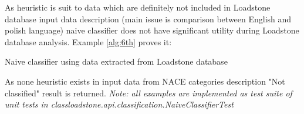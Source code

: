 As heuristic is suit to data which are definitely not included in Loadstone database input data description (main issue is comparison between English and polish language) naive classifier does not have significant utility during Loadstone database analysis. Example \ref{alg:6th} proves it:
\begin{algorithm}
	
	\hfill \break
	\caption{Naive classifier using data extracted from Loadstone database}
	\label{alg:5th}
\end{algorithm}
\newline  
As none heuristic exists in input data from NACE categories description "Not classified" result is returned.
\newline
\textit{Note: all examples are implemented as test suite of unit tests in class\newline loadstone.api.classification.NaiveClassifierTest}    
